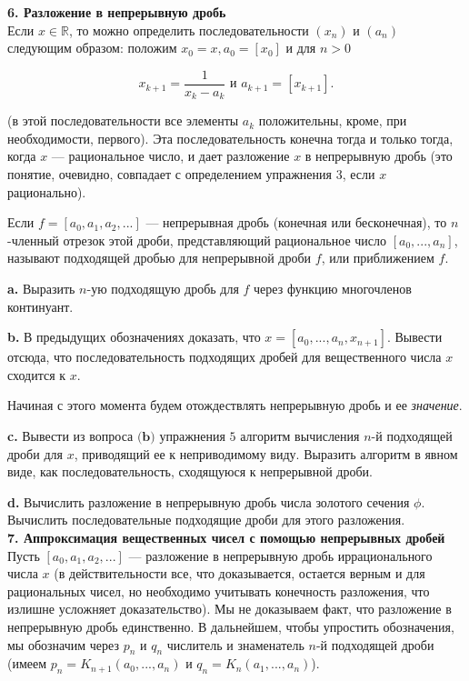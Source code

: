 
\noindent \textbf{6. Разложение в непрерывную дробь}
\\

Если $x \in \mathbb{R}$, то можно определить последовательности $(x_n)$ и $(a_n)$ следующим образом: положим $x_0 = x, a_0 = [x_0]$ и для $n>0$

\[
x_{k+1} = \frac{1}{x_k-a_k} \text{ и } a_{k+1} = [x_{k+1}].
\]

\noindent (в этой последовательности все элементы $a_k$ положительны, кроме,
при необходимости, первого). Эта последовательность конечна тогда
и только тогда, когда $x$ — рациональное число, и дает разложение $x$ в
непрерывную дробь (это понятие, очевидно, совпадает с определением
упражнения 3, если $x$ рационально).

Если $f = [a_0,a_1,a_2,...]$ — непрерывная дробь (конечная или 
бесконечная), то $n$-членный отрезок этой дроби, представляющий 
рациональное число $[a_0,...,a_n]$, называют подходящей дробью для непрерывной дроби $f$, или приближением $f$.

\textbf{a.} Выразить $n$-ую подходящую дробь для $f$ через функцию 
многочленов континуант.

\textbf{b.} В предыдущих обозначениях доказать, что $x = [a_0,...,a_n,x_{n+1}]$. Вывести отсюда, что последовательность подходящих дробей для 
вещественного числа $x$ сходится к $x$.

Начиная с этого момента будем отождествлять непрерывную дробь
и ее \textit{значение}.

\pagebreak

\textbf{c.} Вывести из вопроса $\textbf{(b)}$ упражнения $5$ алгоритм вычисления $n$-й подходящей дроби для $x$, приводящий ее к неприводимому виду. Выразить алгоритм в явном виде, как последовательность, сходящуюся к
непрерывной дроби.

\textbf{d.} Вычислить разложение в непрерывную дробь числа золотого 
сечения $\phi$. Вычислить последовательные подходящие дроби для этого 
разложения.
\\

\noindent \textbf{7. Аппроксимация вещественных чисел с помощью
непрерывных дробей}
\\

Пусть $[a_0,a_1,a_2,...]$ — разложение в непрерывную дробь 
иррационального числа $x$ (в действительности все, что доказывается, 
остается верным и для рациональных чисел, но необходимо учитывать 
конечность разложения, что излишне усложняет доказательство). Мы не
доказываем факт, что разложение в непрерывную дробь 
единственно. В дальнейшем, чтобы упростить обозначения, мы обозначим 
через $p_n$ и $q_n$ числитель и знаменатель $n$-й подходящей дроби (имеем
$p_n = K_{n+1}(a_0,...,a_n)$ и $q_n = K_n(a_1,...,a_n)$).

